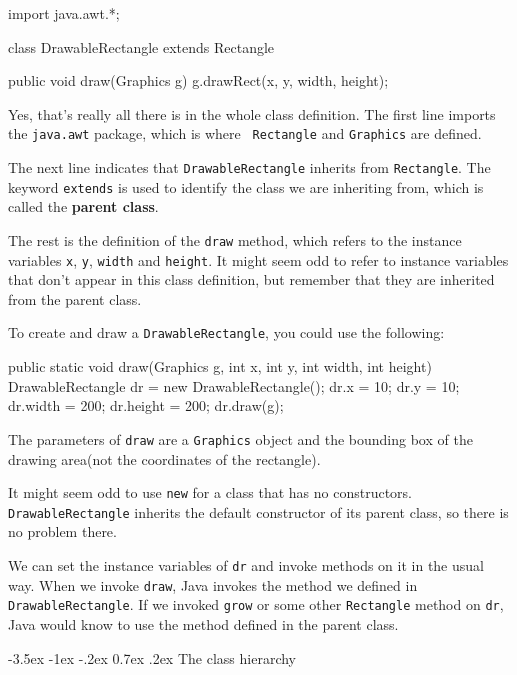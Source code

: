 \documentclass{book}
\makeatletter
\renewcommand{\section}{\@startsection 
    {section} {1} {0mm}%
    {-3.5ex \@plus -1ex \@minus -.2ex}%
    {0.7ex \@plus.2ex}%
    {\normalfont\Large\bfseries}}
\makeatother
\begin{document}
\begin{verbatimtab}
import java.awt.*;

class DrawableRectangle extends Rectangle {

    public void draw(Graphics g) {
        g.drawRect(x, y, width, height);
    }
}
\end{verbatimtab}

Yes, that's really all there is in the whole class definition.  The
first line imports the {\tt java.awt} package, which is where {\tt
Rectangle} and {\tt Graphics} are defined.


The next line indicates that {\tt DrawableRectangle} inherits from
{\tt Rectangle}.  The keyword {\tt extends} is used to identify the
class we are inheriting from, which is called the {\bf parent class}.

The rest is the definition of the {\tt draw} method, which refers to
the instance variables {\tt x}, {\tt y}, {\tt width} and {\tt height}.
It might seem odd to refer to instance variables that don't appear in
this class definition, but remember that they are inherited from the
parent class.

To create and draw a {\tt DrawableRectangle}, you could use
the following:

\begin{verbatimtab}
public static void draw(Graphics g, int x, int y, int width, int height) {
    DrawableRectangle dr = new DrawableRectangle();
    dr.x = 10;       dr.y = 10;
    dr.width = 200;  dr.height = 200;
    dr.draw(g);
}
\end{verbatimtab}

The parameters of {\tt draw} are a {\tt Graphics} object and
the bounding box of the drawing area(not the coordinates of the
rectangle).

It might seem odd to use {\tt new} for a class
that has no constructors.  {\tt DrawableRectangle}
inherits the default constructor of its parent class, so there
is no problem there.


We can set the instance variables of {\tt dr} and invoke methods
on it in the usual way.  When we invoke {\tt draw}, Java invokes
the method we defined in {\tt DrawableRectangle}.  If we invoked
{\tt grow} or some other {\tt Rectangle} method on {\tt dr}, Java
would know to use the method defined in the parent class.


\section{The class hierarchy}
\end{document}
